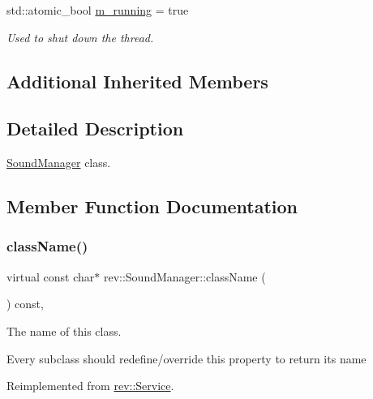 \begin{Indent}
\begin{DoxyCompactItemize}
\mbox{\label{classrev_1_1_sound_manager_afdc92d7f4cde0b683bab4746fbcb720a}} 
std\+::atomic\+\_\+bool \mbox{\hyperlink{classrev_1_1_sound_manager_afdc92d7f4cde0b683bab4746fbcb720a}{m\+\_\+running}} = true
\begin{DoxyCompactList}\small\item\em Used to shut down the thread. \end{DoxyCompactList}\end{DoxyCompactItemize}
\end{Indent}
\subsection*{Additional Inherited Members}


\subsection{Detailed Description}
\mbox{\hyperlink{classrev_1_1_sound_manager}{Sound\+Manager}} class. 

\subsection{Member Function Documentation}
\mbox{\label{classrev_1_1_sound_manager_a1b4c69f6b4e31741ddf76595004fd0fe}} 
\subsubsection{\texorpdfstring{className()}{className()}}
{\footnotesize\ttfamily virtual const char$\ast$ rev\+::\+Sound\+Manager\+::class\+Name (\begin{DoxyParamCaption}{ }\end{DoxyParamCaption}) const\hspace{0.3cm}{\ttfamily [inline]}, {\ttfamily [virtual]}}



The name of this class. 

Every subclass should redefine/override this property to return its name 

Reimplemented from \mbox{\hyperlink{classrev_1_1_service_a484d71757ea6e8780488602cb421a4a5}{rev\+::\+Service}}.

